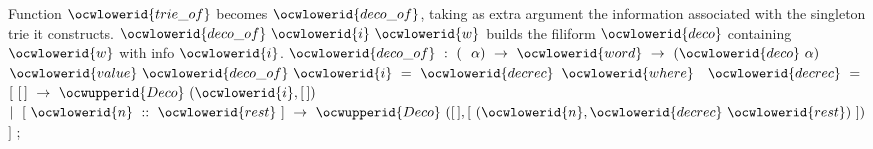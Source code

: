 \documentclass[12pt]{article}
\begin{document}
\ocwendcode{}\ocwindent{0.00em}
Function \ocwbegindcode{}$\ocwlowerid{trie\_of}$\ocwenddcode{} becomes \ocwbegindcode{}$\ocwlowerid{deco\_of}$\ocwenddcode{}, taking as extra argument
the information associated with the singleton trie it constructs. 
\ocweol
\ocwindent{0.00em}
\ocwbegindcode{}$\ocwlowerid{deco\_of}~\ocwlowerid{i}~\ocwlowerid{w}$\ocwenddcode{} builds the filiform \ocwbegindcode{}$\ocwlowerid{deco}$\ocwenddcode{} containing \ocwbegindcode{}$\ocwlowerid{w}$\ocwenddcode{} with info \ocwbegindcode{}$\ocwlowerid{i}$\ocwenddcode{}. 
\ocweol
\ocwindent{0.00em}
\ocwbegindcode{}$\ocwlowerid{deco\_of}~:~($~$\alpha{})~\rightarrow{}~\ocwlowerid{word}~\rightarrow{}~(\ocwlowerid{deco}~\alpha{})$\ocwenddcode{} 
\ocweol
\label{../ML/deco.ml:1681}%
\medskip
\ocwbegincode{}\ocwindent{0.00em}
$\ocwlowerid{value}~\ocwlowerid{deco\_of}~\ocwlowerid{i}~=~\ocwlowerid{decrec}$\ocweol
\ocwindent{1.00em}
$\ocwlowerid{where}~$~$\ocwlowerid{decrec}~=~$\ocweol
\ocwindent{2.00em}
$[~[\,]~\rightarrow{}~\ocwupperid{Deco}~(\ocwlowerid{i},[\,])~$\ocweol
\ocwindent{2.00em}
$\mid{}~[~\ocwlowerid{n}~::~\ocwlowerid{rest}~]~\rightarrow{}~\ocwupperid{Deco}~([\,],[~(\ocwlowerid{n},\ocwlowerid{decrec}~\ocwlowerid{rest})~])$\ocweol
\ocwindent{2.00em}
$]$\ocweol
\ocwindent{0.00em}
;\medskip
\end{document}
